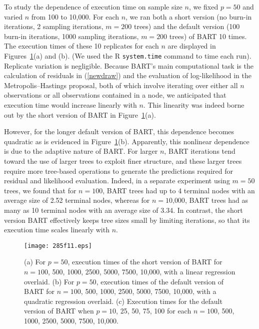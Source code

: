 \documentclass[aoas,nameyear,dvips]{arximspdf}
\begin{document}
To study the dependence of execution time on sample size $n$, we fixed
$p = 50$ and varied $n$ from 100 to 10,000.  For each $n$, we ran both
a short version (no burn-in iterations, 2 sampling iterations, $m =
200$ trees) and the default version (100 burn-in iterations, 1000
sampling iterations, $m = 200$ trees) of BART 10 times. The execution
times of these 10 replicates for each $n$  are displayed in
Figures~\ref{fig:times}(a) and (b). (We used the R \texttt{system.time}
command to time each run). Replicate variation is negligible. Because
BART's main computational task is the calculation of residuals in
(\ref{newdraw}) and the evaluation of log-likelihood in the
Metropolis--Hastings proposal, both of which involve iterating over
either all $n$ observations or all observations contained in a node, we
anticipated that execution time would increase linearly with $n$.  This
linearity was indeed borne out by the short version of BART in
Figure~\ref{fig:times}(a).

However, for the longer default version of BART, this dependence
becomes quadratic as is evidenced in Figure~\ref{fig:times}(b).
Apparently, this nonlinear dependence is due to the adaptive nature of
BART.  For larger $n$, BART iterations tend toward the use of larger
trees to exploit finer structure, and these larger trees require more
tree-based operations to generate the predictions required for residual
and likelihood evaluation.  Indeed, in a separate experiment using $m =
50$ trees, we found that for $n = 100$, BART trees had up to 4 terminal
nodes with an average size of 2.52 terminal nodes, whereas for $n =
10\mbox{,}000$, BART trees had as many as 10 terminal nodes with an average
size of 3.34. In contrast, the short version BART effectively keeps
tree sizes small by limiting iterations, so that its execution time
scales linearly with $n$.


\begin{figure}

\texttt{[image: 285f11.eps]}

\caption{\textup{(a)} For $p = 50$, execution times of the short
version of BART for $n= 100$, 500, 1000, 2500, 5000, 7500, 10,000, with a linear
regression overlaid. \textup{(b)} For $p = 50$, execution times
of the default version of BART for $n= 100$, 500, 1000, 2500, 5000, 7500, 10,000,  with a quadratic
regression overlaid.
\textup{(c)} Execution times for the default version of BART
when $p = 10$, 25, 50, 75, 100 for each $n= 100$, 500, 1000, 2500, 5000, 7500, 10,000.}\label{fig:times}
\end{figure}
\end{document}
